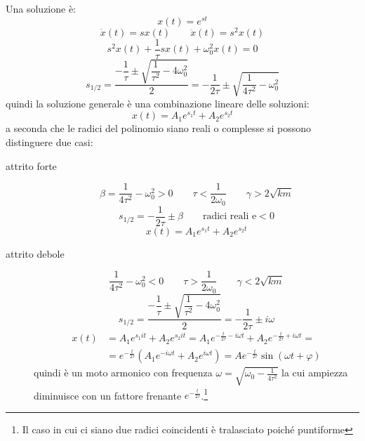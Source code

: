 Una soluzione è:
\begin{equation*}x(t)=e^{st}\end{equation*}
\begin{equation*}\dot x(t)=sx(t)\qquad \ddot x(t)=s^2x(t)\end{equation*}
\begin{equation*}s^2x(t)+\frac{1}{\tau}sx(t)+\omega_0^2x(t)=0\end{equation*}
\begin{equation*}s_{1/2}=\dfrac{-\dfrac{1}{\tau}\pm\sqrt{\dfrac{1}{\tau^2}-4\omega_0^2}}{2}=-\frac{1}{2\tau}\pm\sqrt{\frac{1}{4\tau^2}-\omega_0^2}\end{equation*}
quindi la soluzione generale è una combinazione lineare delle soluzioni:
\begin{equation*}
 x(t)=A_1e^{s_1t}+A_2e^{s_2t}
\end{equation*}
a seconda che le radici del polinomio siano reali o complesse si possono distinguere due casi:
\begin{description}
\item[attrito forte]
\begin{equation*}\beta=\frac{1}{4\tau^2}-\omega_0^2>0\qquad\tau<\frac{1}{2\omega_0}\qquad\gamma>2\sqrt{km}\end{equation*}
\begin{equation*}s_{1/2}=-\frac{1}{2\tau}\pm\beta\qquad\text{radici reali e}<0\end{equation*}
\begin{equation*}x(t)=A_1e^{s_1t}+A_2e^{s_2t}\end{equation*}
\item[attrito debole]
\begin{equation*}\frac{1}{4\tau^2}-\omega_0^2<0\qquad \tau>\frac{1}{2\omega_0}\qquad\gamma<2\sqrt{km}\end{equation*}
\begin{equation*}s_{1/2}=\dfrac{-\dfrac{1}{\tau}\pm\sqrt{\dfrac{1}{\tau^2}-4\omega_0^2}}{2}=-\frac{1}{2\tau}\pm i\omega\end{equation*}
\begin{align*}x(t)&=A_1e^{s_1it}+A_2e^{s_2it}=A_1e^{-\frac{t}{2\tau}-i\omega t}+A_2e^{-\frac{t}{2\tau}+i\omega t}=\\
&=e^{-\frac{t}{2\tau}}\left(A_1e^{-i\omega t}+A_2e^{i\omega t}\right)=A e^{-\frac{t}{2\tau}}\sin(\omega t +\varphi)\end{align*}
quindi è un moto armonico con frequenza $\omega=\sqrt{\omega_0-\frac{1}{4\tau^2}}$ la cui ampiezza diminuisce con un fattore frenante $e^{-\frac{t}{2\tau}}$.\footnote{Il caso in cui ci siano due radici coincidenti è tralasciato poiché puntiforme}
\end{description}

